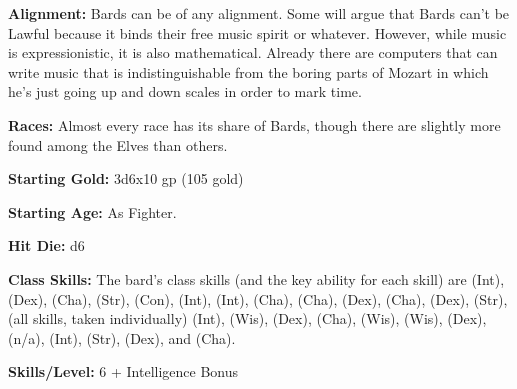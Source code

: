 
\textbf{Alignment:} Bards can be of any alignment. Some will argue that Bards can't be Lawful because it binds their free music spirit or whatever. However, while music is expressionistic, it is also mathematical. Already there are computers that can write music that is indistinguishable from the boring parts of Mozart in which he's just going up and down scales in order to mark time.

\textbf{Races:} Almost every race has its share of Bards, though there are slightly more found among the Elves than others.

\textbf{Starting Gold:} 3d6x10 gp (105 gold)

\textbf{Starting Age:} As Fighter.

\textbf{Hit Die:} d6

\textbf{Class Skills:} The bard's class skills (and the key ability for each skill) are  (Int),  (Dex),  (Cha),  (Str),  (Con),  (Int),  (Int),  (Cha),  (Cha),  (Dex),  (Cha),  (Dex),  (Str),  (all skills, taken individually) (Int),  (Wis),  (Dex),  (Cha),  (Wis),  (Wis),  (Dex),  (n/a),  (Int),  (Str),  (Dex), and  (Cha).

\textbf{Skills/Level:} 6 + Intelligence Bonus

\modebab{}
\poorfor{}
\goodref{}
\goodwil{}

